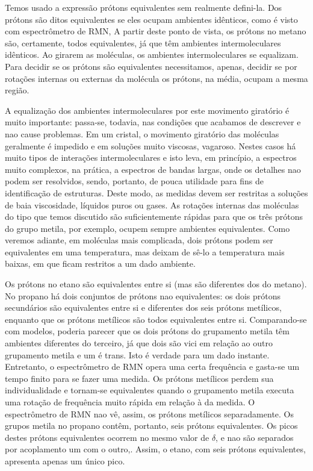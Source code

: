 Temos usado a expressão prótons equivalentes sem realmente defini-la. Dos prótons são ditos equivalentes se eles ocupam ambientes idênticos, como é visto com espectrômetro de RMN, A partir deste ponto de vista, os prótons no metano são, certamente, todos equivalentes, já que têm ambientes intermoleculares idênticos. Ao girarem as moléculas, os ambientes intermoleculares se equalizam. Para decidir se os prótons são equivalentes necessitamos, apenas, decidir se por rotações internas ou externas da molécula os prótons, na média, ocupam a mesma região.

A equalização dos ambientes intermoleculares por este movimento giratório é muito importante: passa-se, todavia, nas condições que acabamos de descrever e nao cause problemas. Em um cristal, o movimento giratório das moléculas geralmente é impedido e em soluções muito viscosas, vagaroso. Nestes casos há muito tipos de interações intermoleculares e isto leva, em princípio, a espectros muito complexos, na prática, a espectros de bandas largas, onde os detalhes nao podem ser resolvidos, sendo, portanto, de pouca utilidade para fins de identificação de estruturas. Deste modo, as medidas devem ser restritas a soluções de baia viscosidade, líquidos puros ou gases. As rotações internas das moléculas do tipo que temos discutido são suficientemente rápidas para que os três prótons do grupo metila, por exemplo, ocupem sempre ambientes equivalentes. Como veremos adiante, em moléculas mais complicada, dois prótons podem ser equivalentes em uma temperatura, mas deixam de sê-lo a temperatura mais baixas, em que ficam restritos a um dado ambiente.

Os prótons no etano são equivalentes entre si (mas são diferentes dos do metano). No propano há dois conjuntos de prótons nao equivalentes: os dois prótons secundários são equivalentes entre si e diferentes dos seis prótons metílicos, enquanto que os prótons metílicos são todos equivalentes entre si. Comparando-se com modelos, poderia parecer que os dois prótons do grupamento metila têm ambientes diferentes do terceiro, já que dois são vici em relação ao outro grupamento metila e um é trans. Isto é verdade para um dado instante. Entretanto, o espectrômetro de RMN opera uma certa frequência e gasta-se um tempo finito para se fazer uma medida. Os prótons metílicos perdem sua individualidade e tornam-se equivalentes quando o grupamento metila executa uma rotação de frequência muito rápida em relação à da medida. O espectrômetro de RMN nao vê, assim, os prótons metílicos separadamente. Os grupos metila no propano contêm, portanto, seis prótons equivalentes. Os picos destes prótons equivalentes ocorrem no mesmo valor de $\delta$, e nao são separados por acoplamento um com o outro,. Assim, o etano, com seis prótons equivalentes, apresenta apenas um único pico. 

